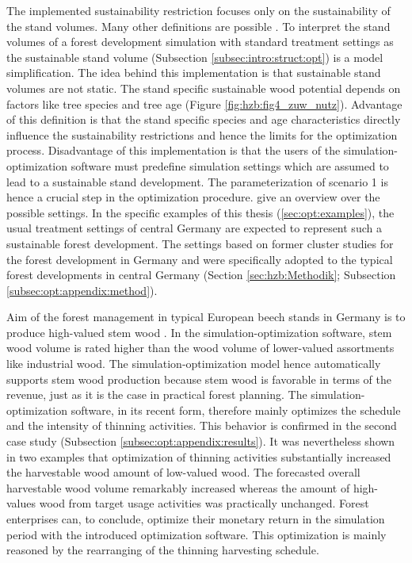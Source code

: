 The implemented sustainability restriction focuses only on the sustainability of the stand volumes. Many other definitions are possible \citep[p. 102]{spellmann_2010}. To interpret the stand volumes of a forest development simulation with standard treatment settings as the sustainable stand volume (Subsection \ref{subsec:intro:struct:opt}) is a model simplification. The idea behind this implementation is that sustainable stand volumes are not static. The stand specific sustainable wood potential depends on factors like tree species and tree age (Figure \ref{fig:hzb:fig4_zuw_nutz}). Advantage of this definition is that the stand specific species and age characteristics directly influence the sustainability restrictions and hence the limits for the optimization process. Disadvantage of this implementation is that the users of the simulation-optimization software must predefine simulation settings which are assumed to lead to a sustainable stand development. The parameterization of scenario 1 is hence a crucial step in the optimization procedure. \citet[p. 90]{hansen_2014} give an overview over the possible settings. In the specific examples of this thesis (\ref{sec:opt:examples}), the usual treatment settings of central Germany are expected to represent such a sustainable forest development. The settings based on former cluster studies for the forest development in Germany and were specifically adopted to the typical forest developments in central Germany (Section \ref{sec:hzb:Methodik}; Subsection \ref{subsec:opt:appendix:method}).

Aim of the forest management in typical European beech stands in Germany is to produce high-valued stem wood \citep{nagel_2008}. In the simulation-optimization software, stem wood volume is rated higher than the wood volume of lower-valued assortments like industrial wood. The simulation-optimization model hence automatically supports stem wood production because stem wood is favorable in terms of the revenue, just as it is the case in practical forest planning. The simulation-optimization software, in its recent form, therefore mainly optimizes the schedule and the intensity of thinning activities. This behavior is confirmed in the second case study (Subsection \ref{subsec:opt:appendix:results}). It was nevertheless shown in two examples that optimization of thinning activities substantially increased the harvestable wood amount of low-valued wood. The forecasted overall harvestable wood volume remarkably increased whereas the amount of high-values wood from target usage activities was practically unchanged. Forest enterprises can, to conclude, optimize their monetary return in the simulation period with the introduced optimization software. This optimization is mainly reasoned by the rearranging of the thinning harvesting schedule.

